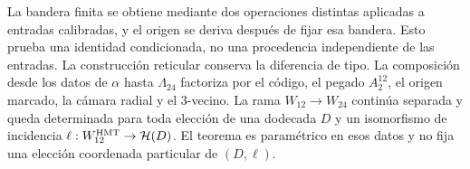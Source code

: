 \enlargethispage{3\baselineskip}
La bandera finita se obtiene mediante dos operaciones distintas aplicadas a
entradas calibradas, y el origen se deriva después de fijar esa bandera. Esto
prueba una identidad condicionada, no una procedencia independiente de las
entradas. La construcción reticular conserva la diferencia de tipo. La
composición desde los datos de \(\alpha\) hasta \(\Lambda_{24}\) factoriza por
el código, el pegado \(A_2^{12}\), el origen marcado, la cámara radial y el
3-vecino. La rama \(W_{12}\to W_{24}\) continúa separada y queda determinada
para toda elección de una dodecada \(D\) y un isomorfismo de incidencia
\(\ell:W_{12}^{\rm HMT}\to\mathcal H(D)\). El teorema es paramétrico en esos
datos y no fija una elección coordenada particular de \((D,\ell)\).
